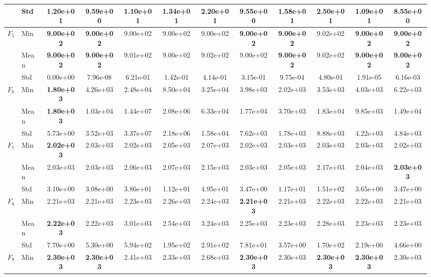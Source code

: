 \begin{center}
\begin{longtable}{clcccccccccc}
 & Std & 1.20e+01 & 9.59e+00 & 1.10e+01 & 1.34e+01 & 2.20e+01 & 9.55e+00 & 1.58e+01 & 2.50e+01 & 1.09e+01 & 8.55e+00 \\
\midrule
\multirow{3}{*}{$F_{5}$} & Min & \textbf{9.00e+02} & \textbf{9.00e+02} & 9.00e+02 & 9.00e+02 & 9.00e+02 & \textbf{9.00e+02} & \textbf{9.00e+02} & 9.02e+02 & \textbf{9.00e+02} & \textbf{9.00e+02} \\
 & Mean & \textbf{9.00e+02} & \textbf{9.00e+02} & 9.01e+02 & 9.00e+02 & 9.02e+02 & 9.00e+02 & \textbf{9.00e+02} & 9.02e+02 & \textbf{9.00e+02} & \textbf{9.00e+02} \\
 & Std & 0.00e+00 & 7.96e-08 & 6.21e-01 & 1.42e-01 & 4.14e-01 & 3.15e-01 & 9.75e-04 & 4.80e-01 & 1.91e-05 & 6.16e-03 \\
\midrule
\multirow{3}{*}{$F_{6}$} & Min & \textbf{1.80e+03} & 4.26e+03 & 2.48e+04 & 8.50e+04 & 3.25e+04 & 3.98e+03 & 2.02e+03 & 3.53e+03 & 4.03e+03 & 6.22e+03 \\
 & Mean & \textbf{1.80e+03} & 1.03e+04 & 1.44e+07 & 2.08e+06 & 6.33e+04 & 1.77e+04 & 3.70e+03 & 1.83e+04 & 9.85e+03 & 1.49e+04 \\
 & Std & 5.73e+00 & 3.52e+03 & 3.37e+07 & 2.18e+06 & 1.58e+04 & 7.62e+03 & 1.78e+03 & 8.88e+03 & 4.22e+03 & 4.84e+03 \\
\midrule
\multirow{3}{*}{$F_{7}$} & Min & \textbf{2.02e+03} & 2.03e+03 & 2.02e+03 & 2.05e+03 & 2.07e+03 & 2.02e+03 & 2.03e+03 & 2.03e+03 & 2.03e+03 & 2.02e+03 \\
 & Mean & 2.03e+03 & 2.03e+03 & 2.06e+03 & 2.07e+03 & 2.15e+03 & 2.03e+03 & 2.05e+03 & 2.17e+03 & 2.04e+03 & \textbf{2.03e+03} \\
 & Std & 3.10e+00 & 3.08e+00 & 3.86e+01 & 1.12e+01 & 4.95e+01 & 3.47e+00 & 1.17e+01 & 1.51e+02 & 3.65e+00 & 3.47e+00 \\
\midrule
\multirow{3}{*}{$F_{8}$} & Min & 2.21e+03 & 2.21e+03 & 2.23e+03 & 2.26e+03 & 2.24e+03 & \textbf{2.21e+03} & 2.21e+03 & 2.22e+03 & 2.22e+03 & 2.21e+03 \\
 & Mean & \textbf{2.22e+03} & 2.22e+03 & 3.01e+03 & 2.54e+03 & 3.24e+03 & 2.25e+03 & 2.23e+03 & 2.28e+03 & 2.23e+03 & 2.23e+03 \\
 & Std & 7.70e+00 & 5.30e+00 & 5.94e+02 & 1.95e+02 & 2.91e+02 & 7.81e+01 & 3.57e+00 & 1.70e+02 & 2.19e+00 & 4.66e+00 \\
\midrule
\multirow{3}{*}{$F_{9}$} & Min & \textbf{2.30e+03} & \textbf{2.30e+03} & 2.41e+03 & 2.33e+03 & 2.68e+03 & \textbf{2.30e+03} & 2.30e+03 & \textbf{2.30e+03} & \textbf{2.30e+03} & 2.30e+03 \\

\end{longtable}
\end{center}
